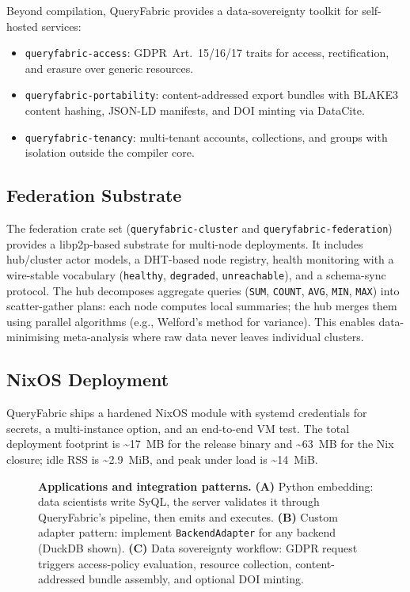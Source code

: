 \documentclass[11pt,a4paper]{article}
\begin{document}
Beyond compilation, QueryFabric provides a data-sovereignty toolkit for
self-hosted services:
\begin{itemize}
  \item \texttt{queryfabric-access}: GDPR~Art.~15/16/17 traits for access,
        rectification, and erasure over generic resources.
  \item \texttt{queryfabric-portability}: content-addressed export bundles
        with BLAKE3 content hashing, JSON-LD manifests, and DOI minting
        via DataCite.
  \item \texttt{queryfabric-tenancy}: multi-tenant accounts, collections,
        and groups with isolation outside the compiler core.
\end{itemize}

\subsection{Federation Substrate}

The federation crate set (\texttt{queryfabric-cluster} and
\texttt{queryfabric-federation}) provides a libp2p-based substrate for
multi-node deployments.
It includes hub/cluster actor models, a DHT-based node registry, health
monitoring with a wire-stable vocabulary (\texttt{healthy},
\texttt{degraded}, \texttt{unreachable}), and a schema-sync protocol.
The hub decomposes aggregate queries (\texttt{SUM}, \texttt{COUNT},
\texttt{AVG}, \texttt{MIN}, \texttt{MAX}) into scatter-gather plans:
each node computes local summaries; the hub merges them using parallel
algorithms (e.g., Welford's method for variance).
This enables data-minimising meta-analysis where raw data never leaves
individual clusters.

\subsection{NixOS Deployment}

QueryFabric ships a hardened NixOS module with systemd credentials for
secrets, a multi-instance option, and an end-to-end VM test.
The total deployment footprint is \textasciitilde17~MB for the release
binary and \textasciitilde63~MB for the Nix closure; idle RSS is
\textasciitilde2.9~MiB, and peak under load is \textasciitilde14~MiB.

\begin{figure}[ht]
  \centering
  
  \caption{\textbf{Applications and integration patterns.}
    \textbf{(A)} Python embedding: data scientists write SyQL, the server
    validates it through QueryFabric's pipeline, then emits and executes.
    \textbf{(B)} Custom adapter pattern: implement \texttt{BackendAdapter}
    for any backend (DuckDB shown). \textbf{(C)} Data sovereignty workflow:
    GDPR request triggers access-policy evaluation, resource collection,
    content-addressed bundle assembly, and optional DOI minting.}
  \label{fig:applications}
\end{figure}
\end{document}

